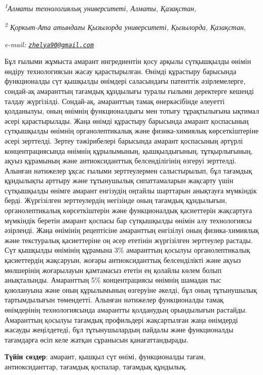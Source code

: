 \begin{affiliation}
\emph{\textsuperscript{1}Алматы технологиялық университеті, Алматы, Қазақстан,}

\emph{\textsuperscript{2} Қоркыт-Ата атындағы Қызылорда университеті, Қызылорда, Қазақстан,}

\emph{e-mail: \href{mailto:zhelya90@gmail.com}{\nolinkurl{zhelya90@gmail.com}}}
\end{affiliation}

Бұл ғылыми жұмыста амарант ингредиентін қосу арқылы сүтқышқылды өнімін
өндіру технологиясын жасау қарастырылған. Өнімді құрастыру барысында
функционалды сүт қышқылды өнімдері саласындағы патенттік әзірлемелерге,
сондай-ақ амаранттың тағамдық құндылығы туралы ғылыми деректерге кешенді
талдау жүргізілді. Сондай-ақ, амаранттың тамақ өнеркәсібінде әлеуетті
қолданылуы, оның өнімнің функционалдығы мен тотығу тұрақтылығына ықтимал
әсері қарастырылады. Жаңа өнімді құрастыру барысында амарант қоспасының
сүтқышқылды өнімнің органолептикалық және физика-химиялық
көрсеткіштеріне әсері зерттелді. Зертеу тәжірибелері барысында амарант
қоспасының әртүрлі концентрациясында өнімнің құрылымының, қышқылдығының,
тұтқырлығының, ақуыз құрамының және антиоксиданттық белсенділігінің
өзгеруі зерттелді. Алынған нәтижелер ұқсас ғылыми зерттеулермен
салыстырылып, бұл тағамдық құндылықты арттыру және тұтынушылық
сипаттамаларын жақсарту үшін сүтқышқылды өнімге амарант енгізудің
оңтайлы шарттарын анықтауға мүмкіндік берді. Жүргізілген зерттеулердің
негізінде оның тағамдық құндылығын, органолептикалық көрсеткіштерін және
функционалдық қасиеттерін жақсартуға мүмкіндік беретін амарант қоспасы
бар сүтқышқылды өнімін алу технологиясы әзірленді. Жаңа өнімінің
рецептісіне амаранттың енгізілуі оның физика-химиялық және текстуралық
қасиеттеріне оң әсер ететінін жүргізілген зерттеулер растады. Сүт
қышқылды өнімінің құрамына 3\% амаранттың қосылуы органолептикалық
қасиеттердің жақсаруын, жоғары антиоксиданттық белсенділікті және ақуыз
мөлшерінің жоғарылауын қамтамасыз ететін ең қолайлы көлем болып
анықталынды. Амаранттың 5\% концентрациясы өнімнің шамадан тыс
қоюлануына және оның құрылымының өзгеруіне әкелді, бұл оның тұтынушылық
тартымдылығын төмендетті. Алынған нәтижелер функционалды тамақ
өнімдерінің технологиясында амарантты қолданудың орындылығын растайды.
Амаранттың қосылуы тағамдық профильдері жақсартылған жаңа өнімдерді
жасауды жеңілдетеді, бұл тұтынушылардың пайдалы және функционалды
тағамдарға өсіп келе жатқан сұранысын қанағаттандырады.

{\bfseries Түйін сөздер}: амарант, қышқыл сүт өнімі, функционалды тағам,
антиоксиданттар, тағамдық қоспалар, тағамдық құндылық.

